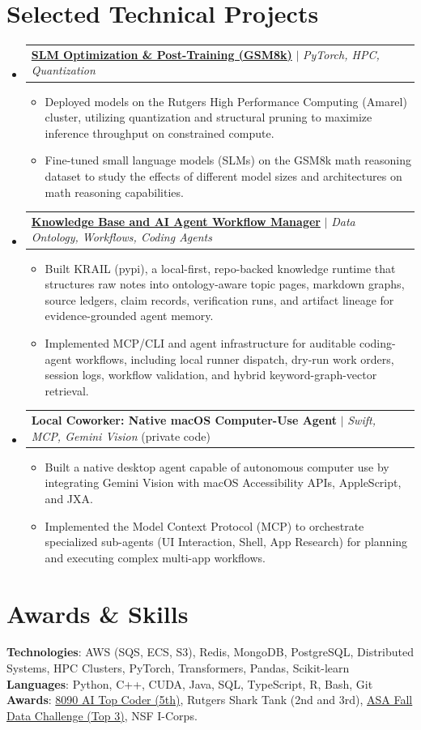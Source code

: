 \documentclass[letterpaper,11pt]{article}
\makeatletter
\newcommand{\resumeItem}[1]{
  \item\small{
    {#1 \vspace{-2pt}}
  }
}
\newcommand{\resumeProjectHeading}[2]{
    \item
    \begin{tabular*}{0.97\textwidth}{l@{\extracolsep{\fill}}r}
      \small#1 & #2 \\
    \end{tabular*}\vspace{-7pt}
}
\newcommand{\resumeSubHeadingListStart}{\begin{itemize}[leftmargin=0.15in, label={}]}
\newcommand{\resumeSubHeadingListEnd}{\end{itemize}}
\newcommand{\resumeItemListStart}{\begin{itemize}}
\newcommand{\resumeItemListEnd}{\end{itemize}\vspace{-5pt}}
\makeatother
\begin{document}
\section{Selected Technical Projects}
    \resumeSubHeadingListStart
      \resumeProjectHeading
          {\href{https://github.com/AkeBoss-tech/llm-research}{\textbf{SLM Optimization \& Post-Training (GSM8k)}} $|$ \emph{PyTorch, HPC, Quantization}}{}
          \resumeItemListStart
            \resumeItem{Deployed models on the Rutgers High Performance Computing (Amarel) cluster, utilizing quantization and structural pruning to maximize inference throughput on constrained compute.}
            \resumeItem{Fine-tuned small language models (SLMs) on the GSM8k math reasoning dataset to study the effects of different model sizes and architectures on math reasoning capabilities.}
          \resumeItemListEnd

      \resumeProjectHeading
          {\href{https://github.com/AkeBoss-tech/knowledge}{\textbf{Knowledge Base and AI Agent Workflow Manager}} $|$ \emph{Data Ontology, Workflows, Coding Agents} }{}
          \resumeItemListStart
            \resumeItem{Built KRAIL (pypi), a local-first, repo-backed knowledge runtime that structures raw notes into ontology-aware topic pages, markdown graphs, source ledgers, claim records, verification runs, and artifact lineage for evidence-grounded agent memory.}
            \resumeItem{Implemented MCP/CLI and agent infrastructure for auditable coding-agent workflows, including local runner dispatch, dry-run work orders, session logs, workflow validation, and hybrid keyword-graph-vector retrieval.}
          \resumeItemListEnd

      \resumeProjectHeading
          {\textbf{Local Coworker: Native macOS Computer-Use Agent} $|$ \emph{Swift, MCP, Gemini Vision} (private code)}{}
          \resumeItemListStart
            \resumeItem{Built a native desktop agent capable of autonomous computer use by integrating Gemini Vision with macOS Accessibility APIs, AppleScript, and JXA.}
            \resumeItem{Implemented the Model Context Protocol (MCP) to orchestrate specialized sub-agents (UI Interaction, Shell, App Research) for planning and executing complex multi-app workflows.}
          \resumeItemListEnd

    \resumeSubHeadingListEnd
\section{Awards \& Skills}
 \begin{itemize}[leftmargin=0.15in, label={}]
    \small{\item{
     \textbf{Technologies}{: AWS (SQS, ECS, S3), Redis, MongoDB, PostgreSQL, Distributed Systems, HPC Clusters, PyTorch, Transformers, Pandas, Scikit-learn} \\
     \textbf{Languages}{: Python, C++, CUDA, Java, SQL, TypeScript, R, Bash, Git} \\
     \textbf{Awards}{: \href{https://github.com/AkeBoss-tech/top-coder-challenge}{8090 AI Top Coder (5th)}, Rutgers Shark Tank (2nd and 3rd), \href{https://acashmoney.biz/portfolio/asa-fall-data/}{ASA Fall Data Challenge (Top 3)}, NSF I-Corps.}
    }}
 \end{itemize}
\end{document}
